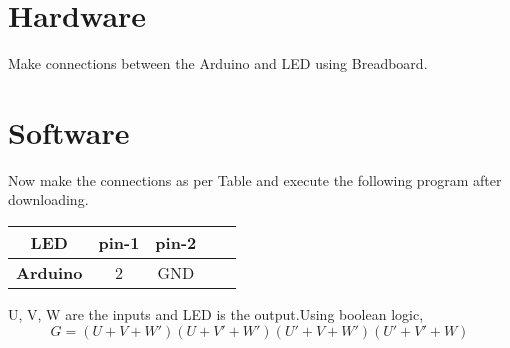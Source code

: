 \documentclass{article}
\begin{document}
\begin{multicols}{2}
    \label{table1}

\section{Hardware}

\textbf{} Make connections between the Arduino and LED using Breadboard.

\section{Software}

\textbf{} Now make the connections as per
Table and execute the following program after
downloading.

\vspace{10mm}

\vspace{10mm}
    \centering
    \begin{tabular}{ |c |c |c |c| c|}

\hline
 \textbf{LED}  & pin-1  & pin-2\\
 \hline
 \textbf{Arduino}  & 2 & GND\\  
 \hline
 \end{tabular}
 \vspace{3mm}
 
    \label{table1}


U, V, W are the
inputs and LED is the output.Using boolean
logic,
\begin{equation}
G= (U+V+W') (U+V'+W') (U'+V+W') (U'+V'+W)
\end{equation}
\end{multicols}{}
\end{document}
